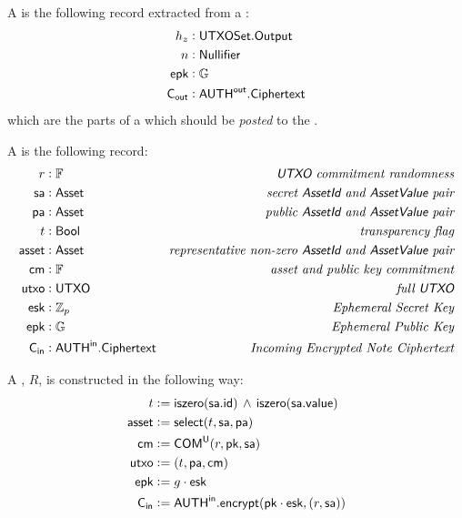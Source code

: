 \begin{definition}
    A \SenderPost{} is the following record extracted from a \Sender{}:
    \begin{align*}
        h_z   &: {\textsf{UTXOSet}}.{\textsf{Output}} \\
        n     &: {\textsf{Nullifier}} \\
        {\textsf{epk}}  &: {\mathbb{G}} \\
        {\textsf{C}_\textsf{out}} &: {{\textsf{AUTH}}^\textsf{out}}.{\textsf{Ciphertext}}
    \end{align*}
    which are the parts of a \Sender{} which should be \emph{posted} to the \Ledger{}.
\end{definition}

\begin{definition}
    A \Receiver{} is the following record:
    \begin{align*}
        r      &: {\mathbb{F}}                  & \textit{{\textsf{UTXO}}{} commitment randomness} \\
        {\textsf{sa}}    &: {\textsf{Asset}}              & \textit{secret {\textsf{AssetId}}{} and {\textsf{AssetValue}}{} pair} \\
        {\textsf{pa}}    &: {\textsf{Asset}}              & \textit{public {\textsf{AssetId}}{} and {\textsf{AssetValue}}{} pair} \\
        t      &: {\textsf{Bool}}               & \textit{transparency flag} \\
        {\textsf{asset}} &: {\textsf{Asset}}              & \textit{representative non-zero {\textsf{AssetId}}{} and {\textsf{AssetValue}}{} pair} \\
        {\textsf{cm}}    &: {\mathbb{F}}                  & \textit{asset and public key commitment} \\
        {\textsf{utxo}}  &: {\textsf{UTXO}}               & \textit{full {\textsf{UTXO}}{}} \\
        {\textsf{esk}}   &: {\mathbb{Z}}_p                & \textit{Ephemeral Secret Key} \\
        {\textsf{epk}}   &: {\mathbb{G}}                  & \textit{Ephemeral Public Key} \\
        {\textsf{C}_\textsf{in}}   &: {{\textsf{AUTH}}^\textsf{in}}.{\textsf{Ciphertext}} & \textit{Incoming Encrypted Note Ciphertext}
    \end{align*}
    
    A \Receiver{}, $R$, is constructed in the following way:
    \begin{align*}
        t      &:= {\textsf{iszero}}({\textsf{sa}}.{\textsf{id}}) \,\wedge\, {\textsf{iszero}}({\textsf{sa}}.{\textsf{value}}) \\
        {\textsf{asset}} &:= {\textsf{select}}(t, {\textsf{sa}}, {\textsf{pa}}) \\
        {\textsf{cm}}    &:= {\textsf{COM}}^{{\textsf{U}}}(r, {\textsf{pk}}, {\textsf{sa}}) \\
        {\textsf{utxo}}  &:= (t, {\textsf{pa}}, {\textsf{cm}}) \\
        {\textsf{epk}}   &:= g \cdot {\textsf{esk}} \\
        {\textsf{C}_\textsf{in}}   &:= {{\textsf{AUTH}}^\textsf{in}}.{\textsf{encrypt}}({\textsf{pk}} \cdot {\textsf{esk}}, (r, {\textsf{sa}}))
    \end{align*}
\end{definition}

